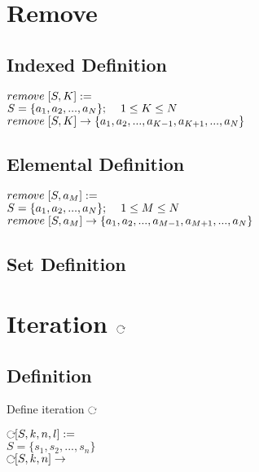\documentclass[11pt]{article}
\def \loop {\ensuremath{\rotatebox[origin=c]{-90}{$\circlearrowright$}}}
\begin{document}
\section{Remove}

\subsection{Indexed Definition}
\begin{center}
$remove \hspace{1mm} \lbrack S,K \rbrack :=$
\\ \vspace{2mm}
$S = \{a_1,a_2,...,a_N\}; \hspace{2mm} \hspace{2mm} 1 \leq K \leq N$
\\ \vspace{2mm}
$remove \hspace{1mm} \lbrack S,K \rbrack \rightarrow \{a_1,a_2,...,a_{K-1},a_{K+1},...,a_N\}$
\end{center}

\subsection{Elemental Definition}
\begin{center}
$remove \hspace{1mm} \lbrack S,a_M \rbrack :=$
\\ \vspace{2mm}
$S = \{a_1,a_2,...,a_N\}; \hspace{2mm} \hspace{2mm} 1 \leq M \leq N$
\\ \vspace{2mm}
$remove \hspace{1mm} \lbrack S,a_M \rbrack \rightarrow \{a_1,a_2,...,a_{M-1},a_{M+1},...,a_N\}$
\end{center}

\subsection{Set Definition}






\section{Iteration \loop}

\subsection{Definition}
Define iteration \loop
\begin{center}
$\loop \lbrack S,k,n,l \rbrack :=$
\\ \vspace{2mm}
$S = \{s_1,s_2,...,s_n\}$
\\ \vspace{2mm}
$\loop \lbrack S,k,n \rbrack \rightarrow$
\end{center}
\end{document}
